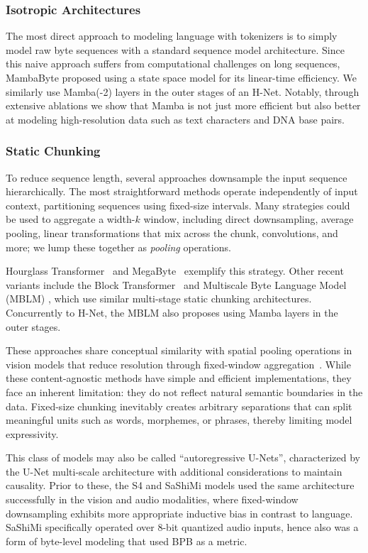 \documentclass{article}
\newcommand{\citep}{\parencite}
\theoremstyle{plain}
\theoremstyle{remark}
\begin{document}
\subsubsection{Isotropic Architectures}
The most direct approach to modeling language with tokenizers is to simply model raw byte sequences with a standard sequence model architecture.
Since this naive approach suffers from computational challenges on long sequences, MambaByte \citep{MambaByte} proposed using a state space model for its linear-time efficiency.
We similarly use Mamba(-2) \citep{Mamba2} layers in the outer stages of an H-Net.
Notably, through extensive ablations we show that Mamba is not just more efficient but also better at modeling high-resolution data such as text characters and DNA base pairs.

\subsubsection{Static Chunking}

To reduce sequence length, several approaches downsample the input sequence hierarchically. 
The most straightforward methods operate independently of input context, partitioning sequences using fixed-size intervals.
Many strategies could be used to aggregate a width-$k$ window, including direct downsampling, average pooling, linear transformations that mix across the chunk, convolutions, and more; we lump these together as \emph{pooling} operations.

Hourglass Transformer~\citep{HourglassTransformer} and MegaByte~\citep{MegaByte} exemplify this strategy.
Other recent variants include the Block Transformer~\citep{ho2024block} and Multiscale Byte Language Model (MBLM) \citep{egli2025multiscale}, which use similar multi-stage static chunking architectures.
Concurrently to H-Net, the MBLM also proposes using Mamba layers in the outer stages.

These approaches share conceptual similarity with spatial pooling operations in vision models that reduce resolution through fixed-window aggregation~\citep{AlexNet, ResNet}.
While these content-agnostic methods have simple and efficient implementations, they face an inherent limitation: they do not reflect natural semantic boundaries in the data.
Fixed-size chunking inevitably creates arbitrary separations that can split meaningful units such as words, morphemes, or phrases, thereby limiting model expressivity.

This class of models may also be called ``autoregressive U-Nets'', characterized by the U-Net multi-scale architecture \citep{U-Net} with additional considerations to maintain causality.
Prior to these, the S4 and SaShiMi models \citep{S4,SaShiMi} used the same architecture successfully in the vision and audio modalities, where fixed-window downsampling exhibits more appropriate inductive bias in contrast to language.
SaShiMi specifically operated over 8-bit quantized audio inputs, hence also was a form of byte-level modeling that used BPB as a metric.
\end{document}
